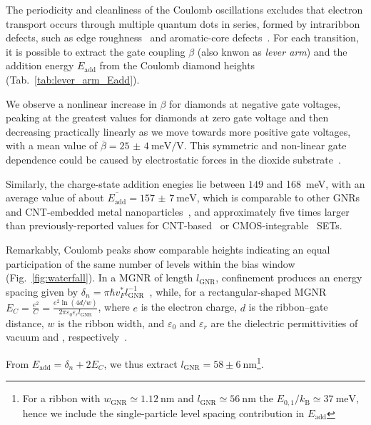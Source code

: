 %
The periodicity and cleanliness of the Coulomb oscillations excludes that electron transport occurs through multiple quantum dots in series, formed by intraribbon defects, such as edge roughness~\cite{mucciolo2009conductance, stampfer2009energy} and aromatic-core defects~\cite{lombardi2019quantum}. For each transition, it is possible to extract the gate coupling $\beta$ (also knwon as \textit{lever arm}) and the addition energy $E_\textrm{add}$ from the Coulomb diamond heights (Tab.~\ref{tab:lever_arm_Eadd}).

We observe a nonlinear increase in $\beta$ for diamonds at negative gate voltages, peaking at the greatest values for diamonds at zero gate voltage and then decreasing practically linearly as we move towards more positive gate voltages, with a mean value of $\overline{\beta}=\SI[separate-uncertainty = true]{25(4)}{\milli\electronvolt\per\volt}$. This symmetric and non-linear gate dependence could be caused by electrostatic forces in the dioxide substrate~\cite{svensson2013nonlinear}.

Similarly, the charge-state addition enegies lie between $149$ and \SI{168}{\milli\electronvolt}, with an average value of about $\overline{E_\textrm{add}}=\SI[separate-uncertainty = true]{157(7)}{\milli\electronvolt}$, which is comparable to other GNRs~\cite{el2020controlled} and CNT-embedded metal nanoparticles~\cite{zhang2018room}, and approximately five times larger than previously-reported values for CNT-based~\cite{postma2001carbon} or CMOS-integrable~\cite{ray2008cmos} \glspl{SET}.

Remarkably, Coulomb peaks show comparable heights indicating an equal participation of the same number of levels within the bias window (Fig.~\ref{fig:waterfall}). In a \gls{MGNR} of length $l_\textrm{GNR}$, confinement produces an energy spacing given by $\delta_n=\pi \hbar v_F^* l^{-1}_\textrm{GNR}$~\cite{wakabayashi2010electronic}, while, for a rectangular-shaped \gls{MGNR} $E_C=\frac{e^2}{C}=\frac{e^2 \ln (4 d / w)}{2 \pi \varepsilon_0 \varepsilon_r l_\textrm{GNR}}$, where $e$ is the electron charge, $d$ is the ribbon--gate distance, $w$ is the ribbon width, and $\varepsilon_0$ and $\varepsilon_r$ are the dielectric permittivities of vacuum and , respectively~\cite{shylau2009capacitance}.

From $E_\mathrm{add}=\delta_n+2E_C$, we thus extract $l_\textrm{GNR}=58 \pm 6 \mathrm{~nm}$\footnote[2]{For a ribbon with $w_\textrm{GNR}\simeq\SI{1.12}{\nano\metre}$ and $l_\textrm{GNR}\simeq\SI{56}{\nano\metre}$ the $E_{0,1}/k_\textrm{B}\simeq\SI{37}{\milli\electronvolt}$, hence we include the single-particle level spacing contribution in $E_\textrm{add}$}.

